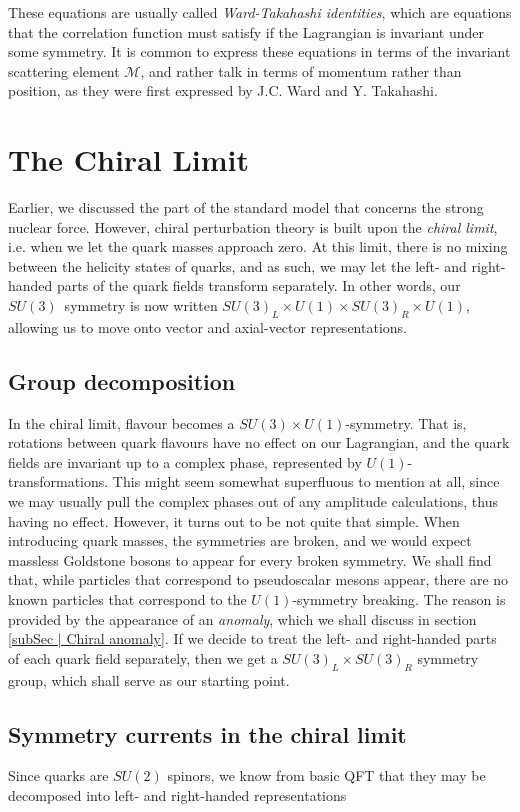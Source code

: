 \documentclass[10pt,twoside]{report}
\begin{document}
	These equations are usually called \emph{Ward-Takahashi identities}, which are equations that the correlation function must satisfy if the Lagrangian is invariant under some symmetry. It is common to express these equations in terms of the invariant scattering element $\mathcal{M}$, and rather talk in terms of momentum rather than position, as they were first expressed by J.C. Ward and Y. Takahashi.
	
	\section{The Chiral Limit}
	Earlier, we discussed the part of the standard model that concerns the strong nuclear force. However, chiral perturbation theory is built upon the \emph{chiral limit}, i.e. when we let the quark masses approach zero. At this limit, there is no mixing between the helicity states of quarks, and as such, we may let the left- and right-handed parts of the quark fields transform separately. In other words, our $SU(3)$ symmetry is now  written $SU(3)_L\times U(1) \times SU(3)_R\times U(1)$, allowing us to move onto vector and axial-vector representations.
	
	\subsection{Group decomposition}
	In the chiral limit, flavour becomes a $SU(3)\times U(1)$-symmetry. That is, rotations between quark flavours have no effect on our Lagrangian, and the quark fields are invariant up to a complex phase, represented by $U(1)$-transformations. This might seem somewhat superfluous to mention at all, since we may usually pull the complex phases out of any amplitude calculations, thus having no effect. However, it turns out to be not quite that simple. When introducing quark masses, the symmetries are broken, and we would expect massless Goldstone bosons to appear for every broken symmetry. We shall find that, while particles that correspond to pseudoscalar mesons appear, there are no known particles that correspond to the $U(1)$-symmetry breaking. The reason is provided by the appearance of an \emph{anomaly}, which we shall discuss in section \ref{subSec | Chiral anomaly}. If we decide to treat the left- and right-handed parts of each quark field separately, then we get a $SU(3)_L\times SU(3)_R$ symmetry group, which shall serve as our starting point.
	
	\subsection{Symmetry currents in the chiral limit}
	Since quarks are $SU(2)$ spinors, we know from basic QFT that they may be decomposed into left- and right-handed representations
	
\end{document}
